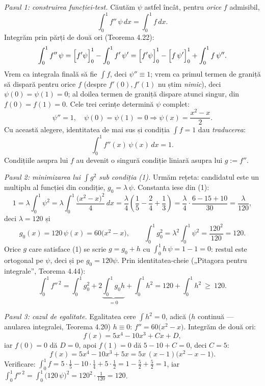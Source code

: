 \emph{Pasul 1: construirea funcției-test.} Căutăm $\psi$ astfel încât, pentru \emph{orice} $f$ admisibil,
\[ \int_{0}^{1}f''\,\psi\,dx=\int_{0}^{1}f\,dx . \]
Integrăm prin părți de două ori (Teorema 4.22):
\[ \int_{0}^{1}f''\,\psi=\Bigl[f'\psi\Bigr]_{0}^{1}-\int_{0}^{1}f'\,\psi'=\Bigl[f'\psi\Bigr]_{0}^{1}-\Bigl[f\,\psi'\Bigr]_{0}^{1}+\int_{0}^{1}f\,\psi'' . \]
Vrem ca integrala finală să fie $\int f$, deci $\psi''\equiv1$; vrem ca primul termen de graniță să dispară pentru orice $f$ (despre $f'(0),f'(1)$ nu știm \emph{nimic}), deci $\psi(0)=\psi(1)=0$; al doilea termen de graniță dispare atunci singur, din $f(0)=f(1)=0$. Cele trei cerințe determină $\psi$ complet:
\[ \psi''=1,\quad \psi(0)=\psi(1)=0 \Longrightarrow \psi(x)=\frac{x^{2}-x}{2} . \]
Cu această alegere, identitatea de mai sus și condiția $\int f=1$ dau \emph{traducerea}:
\[ \int_{0}^{1}f''(x)\,\psi(x)\,dx=1 . \tag{1} \]
Condițiile asupra lui $f$ au devenit o singură condiție liniară asupra lui $g:=f''$.

\emph{Pasul 2: minimizarea lui $\int g^{2}$ sub condiția (1).} Urmăm rețeta: candidatul este un multiplu al funcției din condiție, $g_{0}=\lambda\,\psi$. Constanta iese din (1):
\[ 1=\lambda\int_{0}^{1}\psi^{2}=\lambda\int_{0}^{1}\frac{\bigl(x^{2}-x\bigr)^{2}}{4}\,dx=\frac{\lambda}{4}\left(\frac15-\frac24+\frac13\right)=\frac{\lambda}{4}\cdot\frac{6-15+10}{30}=\frac{\lambda}{120} , \]
deci $\lambda=120$ și
\[ g_{0}(x)=120\,\psi(x)=60\bigl(x^{2}-x\bigr),\qquad \int_{0}^{1}g_{0}^{2}=\lambda^{2}\int_{0}^{1}\psi^{2}=\frac{120^{2}}{120}=120 . \]
Orice $g$ care satisface (1) se scrie $g=g_{0}+h$ cu $\displaystyle\int_{0}^{1}h\,\psi=1-1=0$: restul este ortogonal pe $\psi$, deci și pe $g_{0}=120\psi$. Prin identitatea-cheie („Pitagora pentru integrale'', Teorema 4.44):
\[ \int_{0}^{1}f''^{\,2}=\int_{0}^{1}g_{0}^{2}+2\underbrace{\int_{0}^{1}g_{0}h}_{=0}+\int_{0}^{1}h^{2}=120+\int_{0}^{1}h^{2}\ \ge\ 120 . \]

\emph{Pasul 3: cazul de egalitate.} Egalitatea cere $\int h^{2}=0$, adică ($h$ continuă --- anularea integralei, Teorema 4.20) $h\equiv0$: $f''=60\bigl(x^{2}-x\bigr)$. Integrăm de două ori:
\[ f(x)=5x^{4}-10x^{3}+Cx+D , \]
iar $f(0)=0$ dă $D=0$, apoi $f(1)=0$ dă $5-10+C=0$, deci $C=5$:
\[ f(x)=5x^{4}-10x^{3}+5x=5x\,(x-1)\bigl(x^{2}-x-1\bigr) . \]
Verificare: $\int_{0}^{1}f=5\cdot\frac15-10\cdot\frac14+5\cdot\frac12=1-\frac52+\frac52=1$, iar $\int_{0}^{1}f''^{\,2}=\int_{0}^{1}\bigl(120\,\psi\bigr)^{2}=120^{2}\cdot\frac{1}{120}=120$. \checkmark

